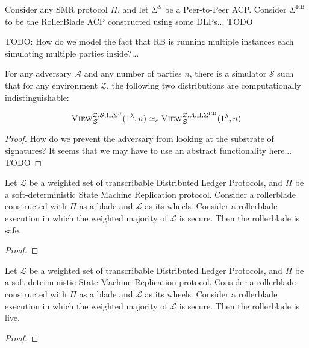 \begin{conjecture}[Similarity]
      Consider any SMR protocol $\Pi$, and let $\Sigma^S$ be a
      Peer-to-Peer ACP. Consider $\Sigma^\mathrm{RB}$ to be the RollerBlade
      ACP constructed using some DLPs... TODO

      TODO: How do we model the fact that RB is running multiple instances
      each simulating multiple parties inside?...

      For any adversary $\mathcal{A}$ and any number of parties $n$,
      there is a simulator $\mathcal{S}$ such that
      for any environment $\mathcal{Z}$,
      the following two distributions
      are computationally indistinguishable:

      \[
            \textsc{View}^{\mathcal{Z},\mathcal{S},\Pi,\Sigma^S}_{\mathcal{Z}}(1^\lambda, n)
            \simeq_c
            \textsc{View}^{\mathcal{Z},\mathcal{A},\Pi,\Sigma^\mathrm{RB}}_{\mathcal{Z}}(1^\lambda, n)
      \]
\end{conjecture}
\begin{proof}
      How do we prevent the adversary from looking at the substrate of signatures?
      It seems that we may have to use an abstract functionality here... TODO
\end{proof}

\begin{corollary}[Safety]
      Let $\mathcal{L}$ be a weighted set of transcribable Distributed Ledger Protocols,
      and $\Pi$ be a soft-deterministic State Machine Replication protocol.
      Consider a rollerblade constructed with $\Pi$ as a blade and
      $\mathcal{L}$ as its wheels.
      Consider a rollerblade execution in which the weighted majority of $\mathcal{L}$
      is secure.
      Then the rollerblade is safe.
\end{corollary}
\begin{proof}
\end{proof}

\begin{corollary}[Liveness]
      Let $\mathcal{L}$ be a weighted set of transcribable Distributed Ledger Protocols,
      and $\Pi$ be a soft-deterministic State Machine Replication protocol.
      Consider a rollerblade constructed with $\Pi$ as a blade and
      $\mathcal{L}$ as its wheels.
      Consider a rollerblade execution in which the weighted majority of $\mathcal{L}$
      is secure.
      Then the rollerblade is live.
\end{corollary}
\begin{proof}
\end{proof}
